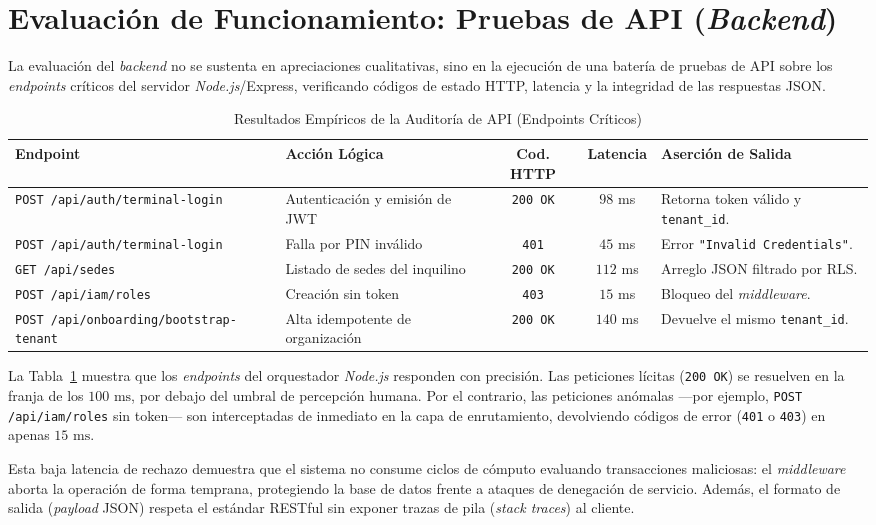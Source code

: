 \section{Evaluaci\'on de Funcionamiento: Pruebas de API (\textit{Backend})}

La evaluaci\'on del \textit{backend} no se sustenta en apreciaciones cualitativas,
sino en la ejecuci\'on de una bater\'ia de pruebas de API sobre los \textit{endpoints}
cr\'iticos del servidor \textit{Node.js}/Express, verificando c\'odigos de estado
HTTP, latencia y la integridad de las respuestas JSON.

\begin{table}[htpb]
\centering
\caption{Resultados Emp\'iricos de la Auditor\'ia de API (Endpoints Cr\'iticos)}
\label{tab:api_tests}
\vspace{2mm}
\small
\begin{tabular}{@{}p{3.4cm}p{2.6cm}ccp{3.0cm}@{}}
\toprule
\textbf{Endpoint} & \textbf{Acci\'on L\'ogica} & \textbf{Cod. HTTP} & \textbf{Latencia} & \textbf{Aserci\'on de Salida} \\
\midrule
\texttt{POST /api/auth/\newline terminal-login} & Autenticaci\'on y emisi\'on de JWT & \texttt{200 OK} & $98$ ms & Retorna token v\'alido y \texttt{tenant\_id}. \\
\texttt{POST /api/auth/\newline terminal-login} & Falla por PIN inv\'alido & \texttt{401} & $45$ ms & Error \texttt{"Invalid Credentials"}. \\
\texttt{GET /api/sedes} & Listado de sedes del inquilino & \texttt{200 OK} & $112$ ms & Arreglo JSON filtrado por RLS. \\
\texttt{POST /api/iam/roles} & Creaci\'on sin token & \texttt{403} & $15$ ms & Bloqueo del \textit{middleware}. \\
\texttt{POST /api/onboarding/\newline bootstrap-tenant} & Alta idempotente de organizaci\'on & \texttt{200 OK} & $140$ ms & Devuelve el mismo \texttt{tenant\_id}. \\
\bottomrule
\end{tabular}
\end{table}

La Tabla~\ref{tab:api_tests} muestra que los \textit{endpoints} del orquestador
\textit{Node.js} responden con precisi\'on. Las peticiones l\'icitas
(\texttt{200 OK}) se resuelven en la franja de los $100 \text{ ms}$, por debajo del
umbral de percepci\'on humana. Por el contrario, las peticiones an\'omalas ---por
ejemplo, \texttt{POST /api/iam/roles} sin token--- son interceptadas de inmediato en
la capa de enrutamiento, devolviendo c\'odigos de error (\texttt{401} o \texttt{403})
en apenas $15 \text{ ms}$.

Esta baja latencia de rechazo demuestra que el sistema no consume ciclos de c\'omputo
evaluando transacciones maliciosas: el \textit{middleware} aborta la operaci\'on de
forma temprana, protegiendo la base de datos frente a ataques de denegaci\'on de
servicio. Adem\'as, el formato de salida (\textit{payload} JSON) respeta el
est\'andar RESTful sin exponer trazas de pila (\textit{stack traces}) al cliente.
